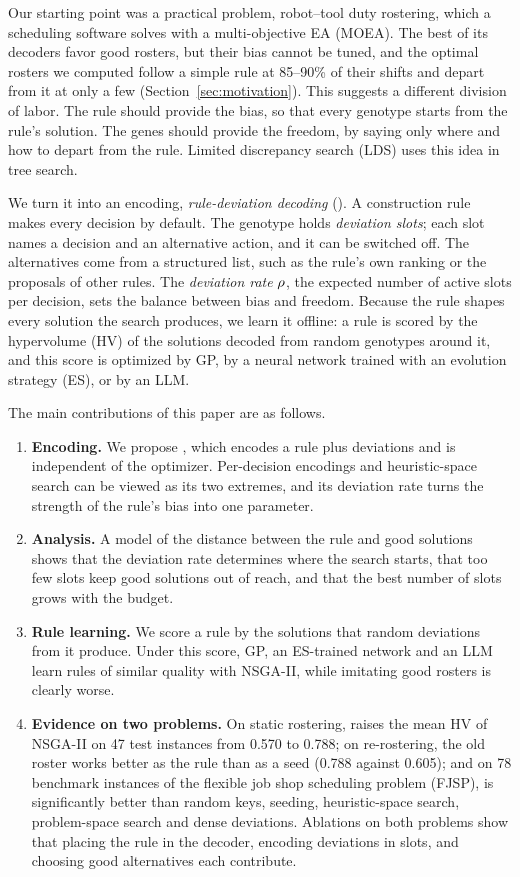 Our starting point was a practical problem, robot--tool duty rostering, which a scheduling software solves with a multi-objective EA (MOEA).
The best of its decoders favor good rosters, but their bias cannot be tuned, and the optimal rosters we computed follow a simple rule at 85--90\% of their shifts and depart from it at only a few (Section~\ref{sec:motivation}).
This suggests a different division of labor.
The rule should provide the bias, so that every genotype starts from the rule's solution.
The genes should provide the freedom, by saying only where and how to depart from the rule.
Limited discrepancy search (LDS) \cite{harvey1995lds} uses this idea in tree search.

We turn it into an encoding, \emph{rule-deviation decoding} (\RDD).
A construction rule makes every decision by default.
The genotype holds \emph{deviation slots}; each slot names a decision and an alternative action, and it can be switched off.
The alternatives come from a structured list, such as the rule's own ranking or the proposals of other rules.
The \emph{deviation rate} $\rho$, the expected number of active slots per decision, sets the balance between bias and freedom.
Because the rule shapes every solution the search produces, we learn it offline:
a rule is scored by the hypervolume (HV) of the solutions decoded from random genotypes around it, and this score is optimized by GP, by a neural network trained with an evolution strategy (ES), or by an LLM.

The main contributions of this paper are as follows.
\begin{enumerate}
  \item \textbf{Encoding.} We propose \RDD, which encodes a rule plus deviations and is independent of the optimizer.
  Per-decision encodings and heuristic-space search can be viewed as its two extremes, and its deviation rate turns the strength of the rule's bias into one parameter.
  \item \textbf{Analysis.} A model of the distance between the rule and good solutions shows that the deviation rate determines where the search starts,
  that too few slots keep good solutions out of reach, and that the best number of slots grows with the budget.
  \item \textbf{Rule learning.} We score a rule by the solutions that random deviations from it produce.
  Under this score, GP, an ES-trained network and an LLM learn rules of similar quality with NSGA-II, while imitating good rosters is clearly worse.
  \item \textbf{Evidence on two problems.} On static rostering, \RDD raises the mean HV of NSGA-II \cite{deb2002nsga2} on 47 test instances from 0.570 to 0.788;
  on re-rostering, the old roster works better as the rule than as a seed (0.788 against 0.605);
  and on 78 benchmark instances of the flexible job shop scheduling problem (FJSP), \RDD is significantly better than random keys, seeding, heuristic-space search, problem-space search and dense deviations.
  Ablations on both problems show that placing the rule in the decoder, encoding deviations in slots, and choosing good alternatives each contribute.
\end{enumerate}

